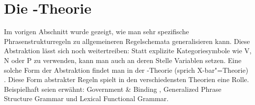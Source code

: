 



\section{Die \xbar-Theorie}
\label{sec-xbar}

Im vorigen Abschnitt wurde gezeigt, wie man sehr spezifische Phrasenstrukturregeln
zu allgemeineren Regelschemata generalisieren kann. Diese Abstraktion lässt sich
noch weitertreiben: Statt explizite Kategoriesymbole wie V, N oder P zu verwenden, kann man auch
an deren Stelle Variablen setzen. Eine solche Form der Abstraktion findet man in
der \xbar-Theorie (sprich X-bar"=Theorie) \citep{Chomsky70a,Jackendoff77}. Diese Form abstrakter Regeln
spielt in den verschiedensten Theorien eine Rolle. Beispielhaft seien
erwähnt: Government \& Binding \indexgb \citep{Chomsky81a,SS88a,Grewendorf88a},
Generalized Phrase Structure Grammar\indexgpsg \citep*{GKPS85a}
und Lexical Functional Grammar\indexlfg \citep{Bresnan82a-ed,Bresnan2001a,BF96a-ed}.

